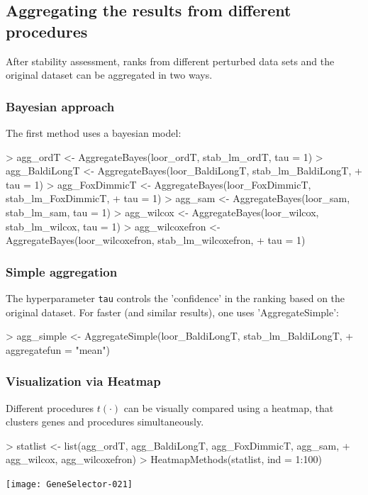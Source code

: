 \subsection{Aggregating the results from different procedures}
After stability assessment, ranks from different perturbed data sets
and the original dataset can be aggregated in two ways.
\subsubsection{Bayesian approach}
The first method uses a bayesian model:

\begin{Schunk}
\begin{Sinput}
> agg_ordT <- AggregateBayes(loor_ordT, stab_lm_ordT, tau = 1)
> agg_BaldiLongT <- AggregateBayes(loor_BaldiLongT, stab_lm_BaldiLongT, 
+     tau = 1)
> agg_FoxDimmicT <- AggregateBayes(loor_FoxDimmicT, stab_lm_FoxDimmicT, 
+     tau = 1)
> agg_sam <- AggregateBayes(loor_sam, stab_lm_sam, tau = 1)
> agg_wilcox <- AggregateBayes(loor_wilcox, stab_lm_wilcox, tau = 1)
> agg_wilcoxefron <- AggregateBayes(loor_wilcoxefron, stab_lm_wilcoxefron, 
+     tau = 1)
\end{Sinput}
\end{Schunk}

\subsubsection{Simple aggregation}
The hyperparameter \texttt{tau} controls the 'confidence' in the ranking
based on the original dataset. For faster (and similar results), one uses 'AggregateSimple':

\begin{Schunk}
\begin{Sinput}
> agg_simple <- AggregateSimple(loor_BaldiLongT, stab_lm_BaldiLongT, 
+     aggregatefun = "mean")
\end{Sinput}
\end{Schunk}

\subsubsection{Visualization via Heatmap}
Different procedures $t(\cdot)$ can be visually compared using a heatmap,
that clusters genes and procedures simultaneously.

\begin{Schunk}
\begin{Sinput}
> statlist <- list(agg_ordT, agg_BaldiLongT, agg_FoxDimmicT, agg_sam, 
+     agg_wilcox, agg_wilcoxefron)
> HeatmapMethods(statlist, ind = 1:100)
\end{Sinput}
\end{Schunk}
\texttt{[image: GeneSelector-021]}

